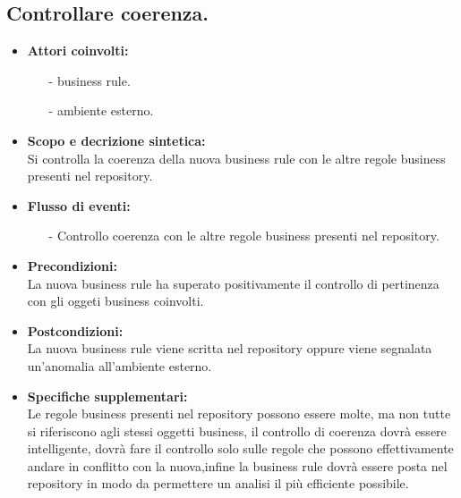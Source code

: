 \documentclass[11pt,titlepage,a4paper]{report}
\begin{document}
\subsection{Controllare coerenza.}
\begin{itemize}
\item{\textbf{Attori coinvolti:}}
\begin{itemize}
 \item[-] business rule.
 \item[-] ambiente esterno.
\end{itemize}
\item{\textbf{Scopo e decrizione sintetica:}}\\
Si controlla la coerenza della nuova business rule con le altre regole business presenti nel repository.
\item{\textbf{Flusso di eventi:}}
\begin{itemize}
\item[-] Controllo coerenza con le altre regole business presenti nel repository.
\end{itemize}
\item{\textbf{Precondizioni:}}\\
La nuova business rule ha superato positivamente il controllo di pertinenza con gli oggeti business coinvolti.
\item{\textbf{Postcondizioni:}}\\
La nuova business rule viene scritta nel repository oppure viene segnalata un'anomalia all'ambiente esterno.
\item\textbf{{Specifiche supplementari:}}\\
Le regole business presenti nel repository possono essere molte, ma non tutte si riferiscono agli stessi oggetti business, il controllo di coerenza dovr\`a essere intelligente, dovr\`a fare il controllo solo sulle regole che possono effettivamente andare in conflitto con la nuova,infine la business rule dovr\`a essere posta nel repository in modo da permettere un analisi il pi\`u efficiente possibile.

\end{itemize}
\end{document}
